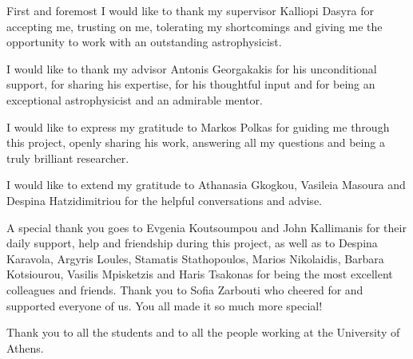 
First and foremost I would like to thank my supervisor Kalliopi Dasyra for accepting me, trusting on me, tolerating my shortcomings and giving me the opportunity to work with an outstanding astrophysicist.   

I would like to thank my advisor Antonis Georgakakis for his unconditional support, for sharing his expertise, for his thoughtful input and for being an exceptional astrophysicist and an admirable mentor.

I would like to express my gratitude to Markos Polkas for guiding me through this project, openly sharing his work, answering all my questions and being a truly brilliant researcher. %

I would like to extend my gratitude to Athanasia Gkogkou, Vasileia Masoura and Despina Hatzidimitriou for the helpful conversations and advise.

\vspace*{0.5cm}
A special thank you goes to Evgenia Koutsoumpou and John Kallimanis for their daily support, help and friendship during this project, as well as to Despina Karavola, Argyris Loules, Stamatis Stathopoulos, Marios Nikolaidis, Barbara Kotsiourou, Vasilis Mpisketzis and Haris Tsakonas for being the most excellent colleagues and friends. Thank you to Sofia Zarbouti who cheered for and supported everyone of us. You all made it so much more special!  

Thank you to all the students and to all the people working at the University of Athens. 


\vspace*{0.5cm}

